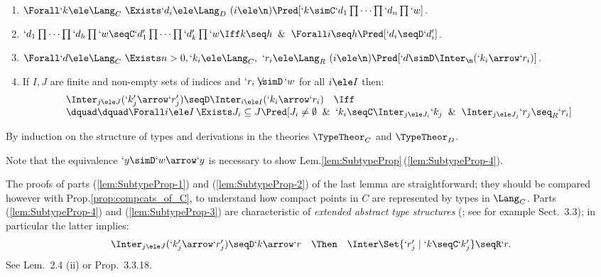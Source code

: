 \documentclass{CSML}
\begin{document}
 \begin{lem} \label{lem:SubtypeProp}\hfill
 \begin{enumerate}
 \item \label{lem:SubtypeProp-1}
$\Forall `k \ele \Lang_C \ \Exists `d_i \ele \Lang_D ~ (i \ele \n) \Pred[ `k \simC `d_1\prod \cdots\prod `d_n\prod `w ] $.

 \item \label{lem:SubtypeProp-2}
$`d_1\prod \cdots\prod `d_h\prod `w \seqC `d'_1\prod \cdots\prod `d'_k\prod `w \Iff k \seq h \And \Forall i \seq h \Pred [ `d_i \seqD `d'_i ] $.

 \item \label{lem:SubtypeProp-4}
$\Forall `d \ele \Lang_C \ \Exists n>0,`k_i \ele \Lang_C ,\ `r_i \ele \Lang_R ~ (i \ele \n) \Pred[ `d \simD \Inter_{\n} (`k _i\arrow `r_i) ] $.

 \item \label{lem:SubtypeProp-3}
If $I,J$ are finite and non-empty sets of indices and $`r_i\not\!\!\simD \,`w $ for all $i \ele I$ then:
%
 \[ \begin{array}{rcl}
 \Inter_{j \ele J} (`k '_j\arrow `r'_j) \seqD \Inter_{i \ele I} (`k _i\arrow `r_i) 
	&\Iff& \\
\multicolumn{3}{l}{\dquad\dquad
 \Forall i \ele I \, \Exists J_i\subseteq J \Pred[ J_i \neq\emptyset \And `k _i\seqC \Inter_{j \ele J_i}`k _j \And \Inter_{j \ele J_j}`r_j \seq_R `r_i ]}
 \end{array} \]

 \end{enumerate}
 \end{lem}

 \begin{Proof} By induction on the structure of types and derivations in the theories $\TypeTheor_C$ and $\TypeTheor_D$. 
 \end{Proof}

\noindent
Note that the equivalence $`y \simD `w\arrow `y$ is necessary to show Lem.\skp\ref{lem:SubtypeProp}\,(\ref{lem:SubtypeProp-4}). 

The proofs of parts (\ref{lem:SubtypeProp-1}) and (\ref{lem:SubtypeProp-2}) of the last lemma are straightforward; they should be compared however with Prop.\skp\ref{prop:compcats_of_C}, to understand how compact points in $C$ are represented by types in $\Lang_C$.
Parts (\ref{lem:SubtypeProp-4}) and (\ref{lem:SubtypeProp-3}) are characteristic of \emph{extended abstract type structures} (\EATS; see for example \cite{Amadio-Curien'98} Sect.~3.3); in particular the latter implies:
%
 \[ \begin{array}{rcl}
\Inter_{j \ele J} (`k '_j\arrow `r'_j) \seqD `k\arrow `r 
	&\Then& 
\Inter\Set{`r'_j\mid `k\seqC `k'_j} \seqR `r.
 \end{array} \]
See \cite{BCD'83} Lem.~2.4 (ii) or \cite{Amadio-Curien'98} Prop.~3.3.18.
\end{document}
